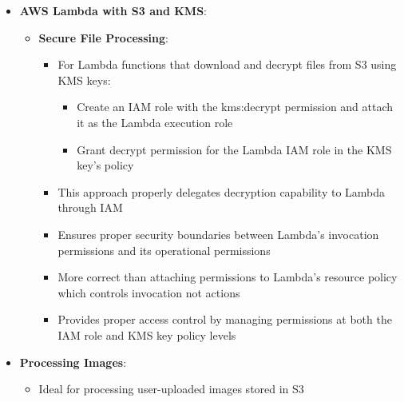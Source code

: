 \documentclass[11pt,a4paper]{report}
\begin{document}
\begin{itemize}
\begin{itemize}
\begin{itemize}
  \item Migrate script logic from EC2 instance to a Lambda function
  \item Configure Lambda to poll the SQS queue and process messages
\end{itemize}
  \item Automatically scales based on queue depth to handle growing number of messages
  \item Pay only for compute time used during actual message processing
  \item Eliminates need to provision and maintain EC2 instances for queue processing
  \item Significantly reduces operational costs compared to always-running EC2 solution
  \item Provides better cost optimization for unpredictable or growing workloads
\end{itemize}
  \item \textbf{AWS Lambda with S3 and KMS}:
\begin{itemize}
  \item \textbf{Secure File Processing}:
\begin{itemize}
  \item For Lambda functions that download and decrypt files from S3 using KMS keys:
\begin{itemize}
  \item Create an IAM role with the kms:decrypt permission and attach it as the Lambda execution role
  \item Grant decrypt permission for the Lambda IAM role in the KMS key's policy
\end{itemize}
  \item This approach properly delegates decryption capability to Lambda through IAM
  \item Ensures proper security boundaries between Lambda's invocation permissions and its operational permissions
  \item More correct than attaching permissions to Lambda's resource policy which controls invocation not actions
  \item Provides proper access control by managing permissions at both the IAM role and KMS key policy levels
\end{itemize}
\end{itemize}
  \item \textbf{Processing Images}:
\begin{itemize}
  \item Ideal for processing user-uploaded images stored in S3

\end{itemize}
\end{itemize}
\end{document}
